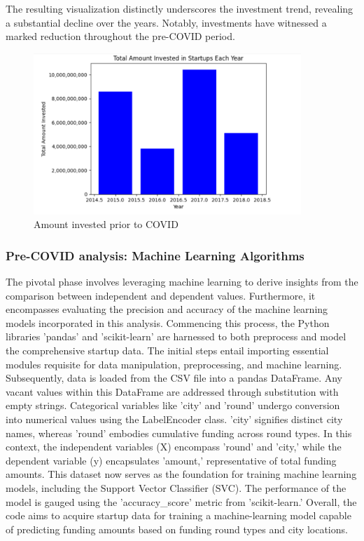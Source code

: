 \documentclass[12pt]{article}
\begin{document}
The resulting visualization distinctly underscores the investment trend, revealing a substantial decline over the years. Notably, investments have witnessed a marked reduction throughout the pre-COVID period.

\begin{figure}[ht]
    \centering
    \includegraphics[width = 0.9\textwidth]{Figures/Pre_Covid_AmountInvested_Years.png}
    \caption{Amount invested prior to COVID}
    \label{fig:Amount invested prior to COVID}
\end{figure}


\subsubsection{Pre-COVID analysis: Machine Learning Algorithms}

The pivotal phase involves leveraging machine learning to derive insights from the comparison between independent and dependent values. Furthermore, it encompasses evaluating the precision and accuracy of the machine learning models incorporated in this analysis. Commencing this process, the Python libraries 'pandas' and 'scikit-learn' are harnessed to both preprocess and model the comprehensive startup data.
The initial steps entail importing essential modules requisite for data manipulation, preprocessing, and machine learning. Subsequently, data is loaded from the CSV file into a pandas DataFrame. Any vacant values within this DataFrame are addressed through substitution with empty strings. Categorical variables like 'city' and 'round' undergo conversion into numerical values using the LabelEncoder class. 'city' signifies distinct city names, whereas 'round' embodies cumulative funding across round types.
In this context, the independent variables (X) encompass 'round' and 'city,' while the dependent variable (y) encapsulates 'amount,' representative of total funding amounts. This dataset now serves as the foundation for training machine learning models, including the Support Vector Classifier (SVC). The performance of the model is gauged using the 'accuracy\_score' metric from 'scikit-learn.'
Overall, the code aims to acquire startup data for training a machine-learning model capable of predicting funding amounts based on funding round types and city locations.
\end{document}
